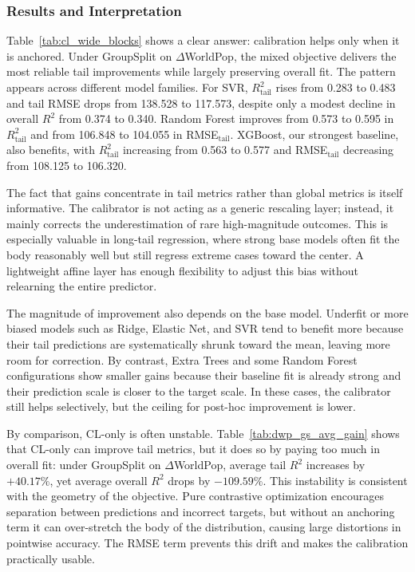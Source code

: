 \documentclass[pdflatex,sn-basic,Numbered]{sn-jnl}
\begin{document}
\subsubsection{Results and Interpretation}

Table~\ref{tab:cl_wide_blocks} shows a clear answer: calibration helps only when it is anchored. Under GroupSplit on $\Delta$WorldPop, the mixed objective delivers the most reliable tail improvements while largely preserving overall fit. The pattern appears across different model families. For SVR, $R^2_{\text{tail}}$ rises from 0.283 to 0.483 and tail RMSE drops from 138.528 to 117.573, despite only a modest decline in overall $R^2$ from 0.374 to 0.340. Random Forest improves from 0.573 to 0.595 in $R^2_{\text{tail}}$ and from 106.848 to 104.055 in RMSE$_{\text{tail}}$. XGBoost, our strongest baseline, also benefits, with $R^2_{\text{tail}}$ increasing from 0.563 to 0.577 and RMSE$_{\text{tail}}$ decreasing from 108.125 to 106.320.

The fact that gains concentrate in tail metrics rather than global metrics is itself informative. The calibrator is not acting as a generic rescaling layer; instead, it mainly corrects the underestimation of rare high-magnitude outcomes. This is especially valuable in long-tail regression, where strong base models often fit the body reasonably well but still regress extreme cases toward the center. A lightweight affine layer has enough flexibility to adjust this bias without relearning the entire predictor.

The magnitude of improvement also depends on the base model. Underfit or more biased models such as Ridge, Elastic Net, and SVR tend to benefit more because their tail predictions are systematically shrunk toward the mean, leaving more room for correction. By contrast, Extra Trees and some Random Forest configurations show smaller gains because their baseline fit is already strong and their prediction scale is closer to the target scale. In these cases, the calibrator still helps selectively, but the ceiling for post-hoc improvement is lower.

By comparison, CL-only is often unstable. Table~\ref{tab:dwp_gs_avg_gain} shows that CL-only can improve tail metrics, but it does so by paying too much in overall fit: under GroupSplit on $\Delta$WorldPop, average tail $R^2$ increases by $+40.17\%$, yet average overall $R^2$ drops by $-109.59\%$. This instability is consistent with the geometry of the objective. Pure contrastive optimization encourages separation between predictions and incorrect targets, but without an anchoring term it can over-stretch the body of the distribution, causing large distortions in pointwise accuracy. The RMSE term prevents this drift and makes the calibration practically usable.
\end{document}
